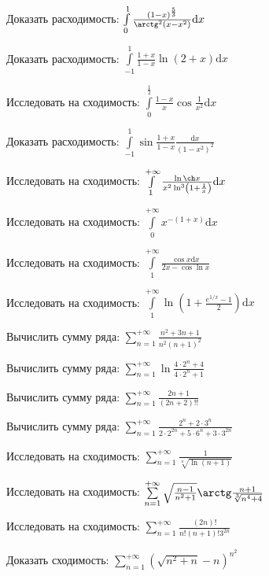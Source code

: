 \documentclass[russian]{article}
\newcommand{\dx}{\text{d}x}
\begin{document}
Доказать расходимость:
$\int\limits_0^1 \frac{(1 - x)^\frac{5}{3}}{\arctg^2 (x - x^2)} \dx$

Доказать расходимость:
$\int\limits_{-1}^1 \frac{1 + x}{1 - x} \ln(2 + x) \dx$

Исследовать на сходимость:
$\int\limits_0^{\frac{1}{2}} \frac{1 - x}{x} \cos \frac{1}{x^2} \dx$

Доказать расходимость:
$\int\limits_{-1}^1 \sin\frac{1 + x}{1 - x} \frac{\dx}{(1 - x^2)^2}$


Исследовать на сходимость:
$\int\limits_1^{+\infty} \frac{\ln \ch x}{x^2 \ln^3 \left(1 + \frac{1}{x}\right)} \dx$

Исследовать на сходимость:
$\int\limits_0^{+\infty} x^{-(1 + x)} \dx$

Исследовать на сходимость:
$\int\limits_1^{+\infty} \frac{\cos x \dx}{2x - \cos \ln x}$

Исследовать на сходимость:
$\int\limits_1^{+\infty} \ln \left(1 + \frac{e^{1/x} - 1}{2} \right)\dx$


Вычислить сумму ряда:
$\sum\limits_{n = 1}^{+\infty} \frac{n^2 + 3n + 1}{n^2 (n + 1)^2}$

Вычислить сумму ряда:
$\sum\limits_{n = 1}^{+\infty}  \ln\frac{4 \cdot 2^n + 4}{4 \cdot 2^n + 1}$

Вычислить сумму ряда:
$\sum\limits_{n = 1}^{+\infty}  \frac{2n + 1}{(2n + 2)!!}$

Вычислить сумму ряда:
$\sum\limits_{n = 1}^{+\infty}  \frac{2^n + 2 \cdot 3^n}{2 \cdot 2^{2n} + 5 \cdot 6^n + 3\cdot 3^{2n}}$


Исследовать на сходимость:
$\sum\limits_{n = 1}^{+\infty} \frac{1}{\sqrt[n]{\ln(n + 1)}}$

Исследовать на сходимость:
$\sum\limits_{n = 1}^{+\infty} \sqrt{\frac{n - 1}{n^2 + 1}} \arctg \frac{n + 1}{\sqrt[3]{n^4 + 4}}$

Исследовать на сходимость:
$\sum\limits_{n = 1}^{+\infty} \frac{(2n)!}{n! (n + 1)! 3^{2n}}$

Доказать сходимость:
$\sum\limits_{n = 1}^{+\infty} (\sqrt{n^2 + n} - n)^{n^2}$
\end{document}
